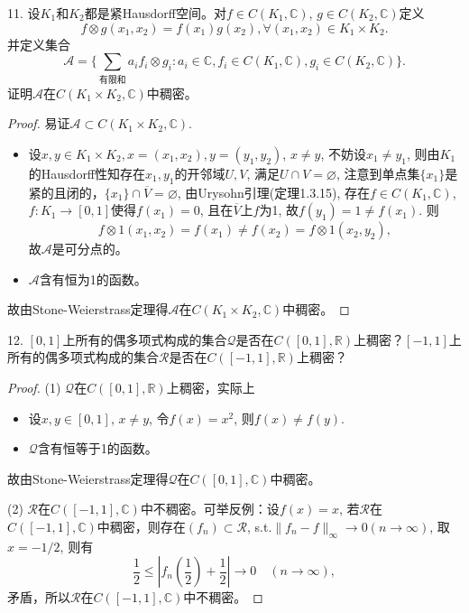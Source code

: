 \documentclass[a4paper,8pt]{ctexart}\textwidth 140mm \textheight 216mm
\newcommand{\8}{\infty}
\begin{document}
11. 设$K_1$和$K_2$都是紧Hausdorff空间。对$f\in C(K_1,\mathbb{C})$, $g\in C(K_2,\mathbb{C})$定义
$$f\otimes g(x_1,x_2)=f(x_1)g(x_2),\forall (x_1,x_2)\in K_1\times K_2.$$
并定义集合
$$\mathcal{A}=\{\sum_{\mbox{有限和}}a_if_i\otimes g_i:a_i\in\mathbb{C},f_i\in C(K_1,\mathbb{C}),g_i\in C(K_2,\mathbb{C})\}.$$
证明$\mathcal{A}$在$C(K_1\times K_2,\mathbb{C})$中稠密。
\begin{proof}
	易证$\mathcal{A}\subset C(K_1\times K_2,\mathbb{C})$.
	\begin{itemize}
		\item 设$x,y\in K_1\times K_2,x=(x_1,x_2),y=(y_1,y_2)$, $x\ne y$, 不妨设$x_1\ne y_1$, 则由$K_1$的Hausdorff性知存在$x_1,y_1$的开邻域$U,V$, 满足$U\cap V=\varnothing$, 注意到单点集$\{x_1\}$是紧的且闭的，$\{x_1\}\cap \overline{V}=\varnothing$, 由Urysohn引理(定理1.3.15), 存在$f\in C(K_1,\mathbb{C})$, $f:K_1\to [0,1]$使得$f(x_1)=0$, 且在$\overline{V}$上$f$为1, 故$f(y_1)=1\ne f(x_1)$. 则
		$$f\otimes 1(x_1,x_2)=f(x_1)\ne f(x_2)=f\otimes 1(x_2,y_2),$$
		故$\mathcal{A}$是可分点的。
		\item $\mathcal{A}$含有恒为1的函数。 
	\end{itemize}
故由Stone-Weierstrass定理得$\mathcal{A}$在$C(K_1\times K_2,\mathbb{C})$中稠密。
\end{proof}

12. $[0,1]$上所有的偶多项式构成的集合$\mathcal{Q}$是否在$C([0,1],\mathbb{R})$上稠密？$[-1,1]$上所有的偶多项式构成的集合$\mathcal{R}$是否在$C([-1,1],\mathbb{R})$上稠密？
\begin{proof}
	(1)
	$\mathcal{Q}$在$C([0,1],\mathbb{R})$上稠密，实际上
	\begin{itemize}
		\item 设$x,y\in[0,1]$, $x\ne y$, 令$f(x)=x^2$, 则$f(x)\ne f(y)$.
		\item $\mathcal{Q}$含有恒等于1的函数。
	\end{itemize}
故由Stone-Weierstrass定理得$\mathcal{Q}$在$C([0,1],\mathbb{C})$中稠密。

   (2) $\mathcal{R}$在$C([-1,1],\mathbb{C})$中不稠密。可举反例：设$f(x)=x$, 若$\mathcal{R}$在$C([-1,1],\mathbb{C})$中稠密，则存在$(f_n)\subset \mathcal{R}$, s.t.$\|f_n-f\|_\infty\to 0(n\to\infty)$, 取$x=-1/2$, 则有
   $$\frac{1}{2}\leq |f_n(\frac{1}{2})+\frac{1}{2}|\to0\quad(n\to\infty),$$
   矛盾，所以$\mathcal{R}$在$C([-1,1],\mathbb{C})$中不稠密。
\end{proof}
\end{document}
